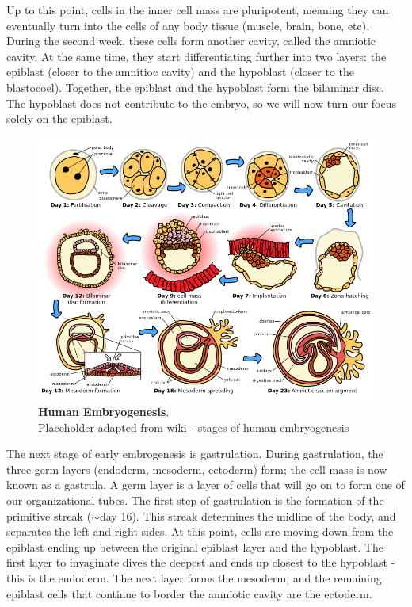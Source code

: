 Up to this point, cells in the inner cell mass are pluripotent, meaning they can eventually turn into the cells of any body tissue (muscle, brain, bone, etc). 
During the second week, these cells form another cavity, called the amniotic cavity. 
At the same time, they start differentiating further into two layers: the epiblast (closer to the amnitioc cavity) and the hypoblast (closer to the blastocoel). 
Together, the epiblast and the hypoblast form the bilaminar disc.
The hypoblast does not contribute to the embryo, so we will now turn our focus solely on the epiblast.\\

\begin{figure}[h]
\centering
\includegraphics[width=15cm]{Chapter1/Fig/wiki_human_embryogenesis.png}
\caption[\textbf{Human Embryogenesis}]{\textbf{Human Embryogenesis}.\\
Placeholder adapted from wiki - stages of human embryogenesis}
\label{fig:embryogenesis}
\end{figure}

The next stage of early embrogenesis is gastrulation.
During gastrulation, the three germ layers (endoderm, mesoderm, ectoderm) form; the cell mass is now known as a gastrula.
A germ layer is a layer of cells that will go on to form one of our organizational tubes.
The first step of gastrulation is the formation of the primitive streak ($\sim$day 16).
This streak determines the midline of the body, and separates the left and right sides.
At this point, cells are moving down from the epiblast ending up between the original epiblast layer and the hypoblast.
The first layer to invaginate dives the deepest and ends up closest to the hypoblast - this is the endoderm.
The next layer forms the mesoderm, and the remaining epiblast cells that continue to border the amniotic cavity are the ectoderm.\\

